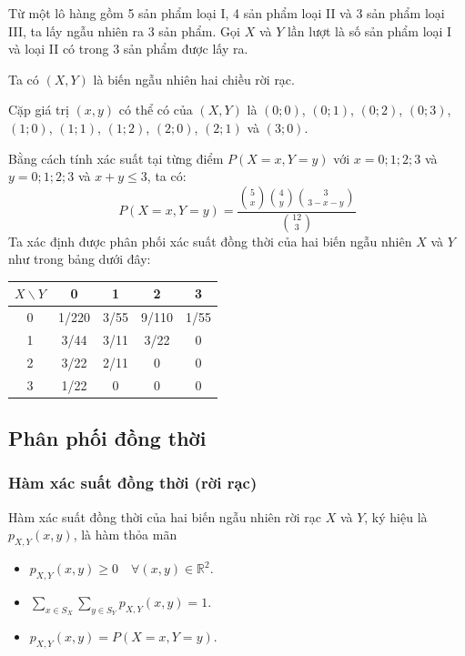 \documentclass[12pt,a4paper]{article}
\begin{document}
\begin{vidu}[title={Lô hàng ba loại sản phẩm}]
  Từ một lô hàng gồm 5 sản phẩm loại I, 4 sản phẩm loại II và 3 sản phẩm loại III, ta lấy ngẫu nhiên ra 3 sản phẩm. Gọi $X$ và $Y$ lần lượt là số sản phẩm loại I và loại II có trong 3 sản phẩm được lấy ra.
  
  Ta có $(X,Y)$ là biến ngẫu nhiên hai chiều rời rạc.
  
  Cặp giá trị $(x, y)$ có thể có của $(X, Y )$ là $(0; 0)$, $(0; 1)$, $(0; 2)$, $(0; 3)$, $(1; 0)$, $(1; 1)$, $(1; 2)$, $(2; 0)$, $(2; 1)$ và $(3; 0)$.
  
  Bằng cách tính xác suất tại từng điểm $P(X = x, Y = y)$ với $x = 0; 1; 2; 3$ và $y = 0; 1; 2; 3$ và $x + y \le 3$, ta có:
  \[
    P(X = x, Y = y) = \dfrac{\displaystyle\binom{5}{x}\binom{4}{y}\binom{3}{3-x-y}}{\displaystyle\binom{12}{3}}
  \]
  Ta xác định được phân phối xác suất đồng thời của hai biến ngẫu nhiên $X$ và $Y$ như trong bảng dưới đây:
  \begin{center}
    \begin{tabular}{c|cccc}
      $X \backslash Y$ & 0 & 1 & 2 & 3 \\
      \hline
      0 & 1/220 & 3/55 & 9/110 & 1/55 \\
      1 & 3/44 & 3/11 & 3/22 & 0 \\
      2 & 3/22 & 2/11 & 0 & 0 \\
      3 & 1/22 & 0 & 0 & 0 \\
    \end{tabular}
  \end{center}
\end{vidu}

\subsection{Phân phối đồng thời}

\subsubsection{Hàm xác suất đồng thời (rời rạc)}

\begin{dinhnghia}[title={Phân phối đồng thời}]
  Hàm xác suất đồng thời của hai biến ngẫu nhiên rời rạc $X$ và $Y$, ký hiệu là $p_{X,Y}(x, y)$, là hàm thỏa mãn
  \begin{itemize}
    \item $p_{X,Y}(x, y) \ge 0 \quad \forall (x, y) \in \mathbb{R}^2$.
    \item $\displaystyle\sum_{x \in S_X} \displaystyle\sum_{y \in S_Y} p_{X,Y}(x, y) = 1$.
    \item $p_{X,Y}(x, y) = P(X = x, Y = y)$.
  \end{itemize}
\end{dinhnghia}
\end{document}
